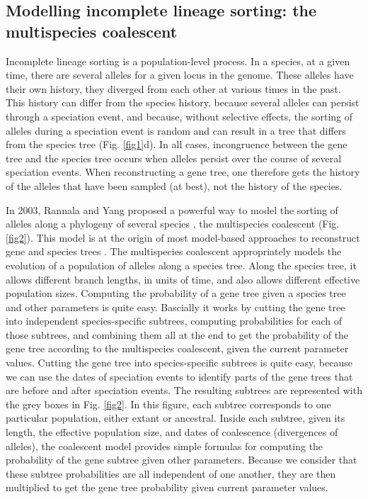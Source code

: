 \subsection{Modelling incomplete lineage sorting: the multispecies coalescent}
Incomplete lineage sorting is a population-level process.
In a species, at a given time, there are several alleles for a given locus in the genome.
These alleles have their own history, they diverged from each other at various times in the past.
This history can differ from the species history, because several alleles can persist through a speciation event, and because, without selective effects, the sorting of alleles during a speciation event is random and can result in a tree that differs from the species tree (Fig. \ref{fig1}d).
In all cases, incongruence between the gene tree and the species tree occurs when alleles persist over the course of several speciation events.
When reconstructing a gene tree, one therefore gets the history of the alleles that have been sampled (at best), not the history of the species. 

In 2003, Rannala and Yang proposed a powerful way to model the sorting of alleles along a phylogeny of several species \citep{Rannala2003a}, the multispecies coalescent (Fig. \ref{fig2}).
This model is at the origin of most model-based approaches to reconstruct gene and species trees \citep{Edwards2007,Heled2010}.
The multispecies coalescent appropriately models the evolution of a population of alleles along a species tree.
Along the species tree, it allows different branch lengths, in units of time, and also allows different effective population sizes.
Computing the probability of a gene tree given a species tree and other parameters is quite easy.
Bascially it works by cutting the gene tree into independent species-specific subtrees, computing probabilities for each of those subtrees, and combining them all at the end to get the probability of the gene tree according to the multispecies coalescent, given the current parameter values.
Cutting the gene tree into species-specific subtrees is quite easy, because we can use the dates of speciation events to identify parts of the gene trees that are before and after speciation events. 
The resulting subtrees are represented with the grey boxes in Fig. \ref{fig2}.
In this figure, each subtree corresponds to one particular population, either extant or ancestral.
Inside each subtree, given its length, the effective population size, and dates of coalescence (divergences of alleles), the coalescent model provides simple formulas for computing the probability of the gene subtree given other parameters.
Because we consider that these subtree probabilities are all independent of one another, they are then multiplied to get the gene tree probability given current parameter values.
 
